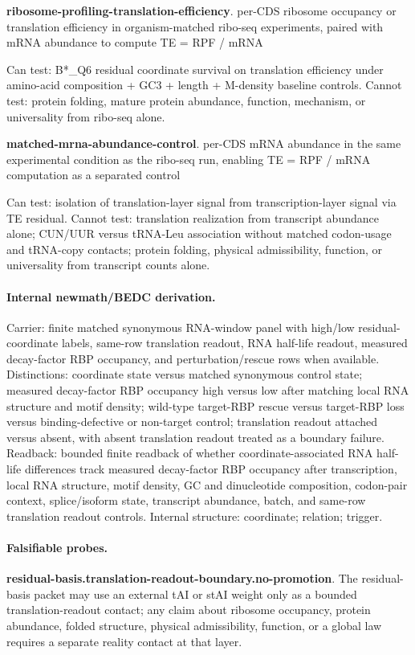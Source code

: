 \textbf{ribosome-profiling-translation-efficiency}. per-CDS ribosome occupancy or translation efficiency in organism-matched ribo-seq experiments, paired with mRNA abundance to compute TE = RPF / mRNA

Can test: B*\_Q6 residual coordinate survival on translation efficiency under amino-acid composition + GC3 + length + M-density baseline controls. Cannot test: protein folding, mature protein abundance, function, mechanism, or universality from ribo-seq alone.

\textbf{matched-mrna-abundance-control}. per-CDS mRNA abundance in the same experimental condition as the ribo-seq run, enabling TE = RPF / mRNA computation as a separated control

Can test: isolation of translation-layer signal from transcription-layer signal via TE residual. Cannot test: translation realization from transcript abundance alone; CUN/UUR versus tRNA-Leu association without matched codon-usage and tRNA-copy contacts; protein folding, physical admissibility, function, or universality from transcript counts alone.

\paragraph{Internal newmath/BEDC derivation.} Carrier: finite matched synonymous RNA-window panel with high/low residual-coordinate labels, same-row translation readout, RNA half-life readout, measured decay-factor RBP occupancy, and perturbation/rescue rows when available. Distinctions: coordinate state versus matched synonymous control state; measured decay-factor RBP occupancy high versus low after matching local RNA structure and motif density; wild-type target-RBP rescue versus target-RBP loss versus binding-defective or non-target control; translation readout attached versus absent, with absent translation readout treated as a boundary failure. Readback: bounded finite readback of whether coordinate-associated RNA half-life differences track measured decay-factor RBP occupancy after transcription, local RNA structure, motif density, GC and dinucleotide composition, codon-pair context, splice/isoform state, transcript abundance, batch, and same-row translation readout controls. Internal structure: coordinate; relation; trigger.

\paragraph{Falsifiable probes.}
\textbf{residual-basis.translation-readout-boundary.no-promotion}. The residual-basis packet may use an external tAI or stAI weight only as a bounded translation-readout contact; any claim about ribosome occupancy, protein abundance, folded structure, physical admissibility, function, or a global law requires a separate reality contact at that layer.

